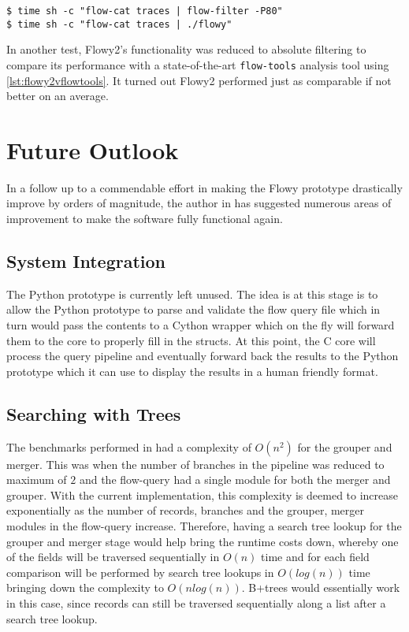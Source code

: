 \begin{lstlisting}
$ time sh -c "flow-cat traces | flow-filter -P80"
$ time sh -c "flow-cat traces | ./flowy"
\end{lstlisting}

In another test, Flowy2's functionality was reduced to absolute filtering to compare its performance with a state-of-the-art \texttt{flow-tools} analysis tool using \ref{lst:flowy2vflowtools}. It turned out Flowy2 performed just as comparable if not better on an average.

\section{Future Outlook}\label{sec:flowy2-future}
In a follow up to a commendable effort in making the Flowy prototype drastically improve by orders of magnitude, the author in \cite{jschauer:thesis:2011} has suggested numerous areas of improvement to make the software fully functional again.

\subsection{System Integration}\label{subsec:system-integration}
The Python prototype is currently left unused. The idea is at this stage is to allow the Python prototype to parse and validate the flow query file which in turn would pass the contents to a Cython wrapper which on the fly will forward them to the core to properly fill in the structs. At this point, the C core will process the query pipeline and eventually forward back the results to the Python prototype which it can use to display the results in a human friendly format.

\subsection{Searching with Trees}\label{subsec:search-trees} 
The benchmarks performed in \cite{jschauer:thesis:2011} had a complexity of $O(n^2)$ for the grouper and merger. This was when the number of branches in the pipeline was reduced to maximum of $2$ and the flow-query had a single module for both the merger and grouper. With the current implementation, this complexity is deemed to increase exponentially as the number of records, branches and the grouper, merger modules in the flow-query increase. Therefore, having a search tree lookup for the grouper and merger stage would help bring the runtime costs down, whereby one of the fields will be traversed sequentially in $O(n)$ time and for each field comparison will be performed  by search tree lookups in $O(log(n))$ time bringing down the complexity to $O(nlog(n))$. B+trees would essentially work in this case, since records can still be traversed sequentially along a list after a search tree lookup. 

